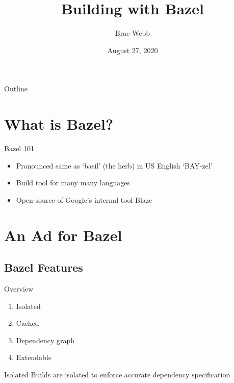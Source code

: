 \documentclass[aspectratio=169]{beamer}
\title{Building with Bazel}
\author{Brae Webb}
\institute{University of Queensland}
\date{August 27, 2020}
\begin{document}

\begin{title-slide}
\titlepage
\end{title-slide}

\begin{split-slide}{Outline}
    \vspace{4em}
    \tableofcontents
\end{split-slide}

\section{What is Bazel?}

\begin{body-slide}{Bazel 101}
\begin{itemize}[<+-| alert@+>]
    \color{UQCSBlue}
    \item Pronounced same as `basil' (the herb) in US English `BAY-zel'
    \item Build tool for many many languages
    \item Open-source of Google's internal tool Blaze
\end{itemize}

\end{body-slide}

\section{An Ad for Bazel}

\subsection{Bazel Features}
\begin{split-slide}{Overview}
\begin{enumerate}
    \item Isolated
    \item Cached
    \item Dependency graph
    \item Extendable
\end{enumerate}
\end{split-slide}

\begin{body-slide}{Isolated}
Builds are isolated to enforce accurate dependency specification
\end{body-slide}
\end{document}
